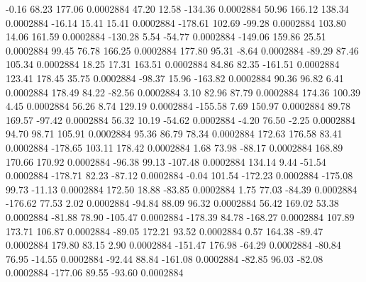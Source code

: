        -0.16       68.23      177.06     0.0002884
       47.20       12.58     -134.36     0.0002884
       50.96      166.12      138.34     0.0002884
      -16.14       15.41       15.41     0.0002884
     -178.61      102.69      -99.28     0.0002884
      103.80       14.06      161.59     0.0002884
     -130.28        5.54      -54.77     0.0002884
     -149.06      159.86       25.51     0.0002884
       99.45       76.78      166.25     0.0002884
      177.80       95.31       -8.64     0.0002884
      -89.29       87.46      105.34     0.0002884
       18.25       17.31      163.51     0.0002884
       84.86       82.35     -161.51     0.0002884
      123.41      178.45       35.75     0.0002884
      -98.37       15.96     -163.82     0.0002884
       90.36       96.82        6.41     0.0002884
      178.49       84.22      -82.56     0.0002884
        3.10       82.96       87.79     0.0002884
      174.36      100.39        4.45     0.0002884
       56.26        8.74      129.19     0.0002884
     -155.58        7.69      150.97     0.0002884
       89.78      169.57      -97.42     0.0002884
       56.32       10.19      -54.62     0.0002884
       -4.20       76.50       -2.25     0.0002884
       94.70       98.71      105.91     0.0002884
       95.36       86.79       78.34     0.0002884
      172.63      176.58       83.41     0.0002884
     -178.65      103.11      178.42     0.0002884
        1.68       73.98      -88.17     0.0002884
      168.89      170.66      170.92     0.0002884
      -96.38       99.13     -107.48     0.0002884
      134.14        9.44      -51.54     0.0002884
     -178.71       82.23      -87.12     0.0002884
       -0.04      101.54     -172.23     0.0002884
     -175.08       99.73      -11.13     0.0002884
      172.50       18.88      -83.85     0.0002884
        1.75       77.03      -84.39     0.0002884
     -176.62       77.53        2.02     0.0002884
      -94.84       88.09       96.32     0.0002884
       56.42      169.02       53.38     0.0002884
      -81.88       78.90     -105.47     0.0002884
     -178.39       84.78     -168.27     0.0002884
      107.89      173.71      106.87     0.0002884
      -89.05      172.21       93.52     0.0002884
        0.57      164.38      -89.47     0.0002884
      179.80       83.15        2.90     0.0002884
     -151.47      176.98      -64.29     0.0002884
      -80.84       76.95      -14.55     0.0002884
      -92.44       88.84     -161.08     0.0002884
      -82.85       96.03      -82.08     0.0002884
     -177.06       89.55      -93.60     0.0002884
